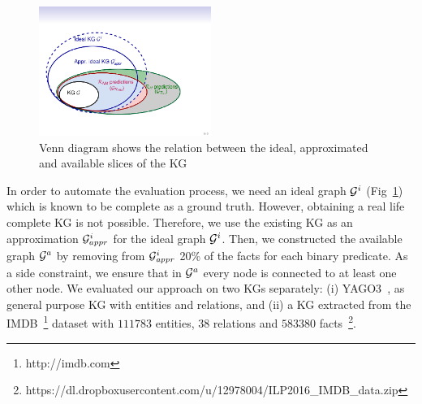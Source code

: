 \begin{figure}
\centering
\includegraphics[width=0.5\textwidth]{figures/big_pic_exp}
\caption{Venn diagram shows the relation between the ideal, approximated and available slices of the KG}
\label{fig:venn}
\end{figure}
 In order to automate the evaluation process, we need an ideal graph $\mathcal{G}^i$ (Fig~\ref{fig:venn}) which is known to be complete as a ground truth. However, obtaining a real life complete KG is not possible. Therefore, we use the existing KG as an approximation $\mathcal{G}^i_{appr}$ for the ideal graph $\mathcal{G}^i$. Then, we constructed the available graph $\mathcal{G}^a$ by removing from $\mathcal{G}^i_{\mathit{appr}}$ 20\% of the facts for each binary predicate. As a side constraint, we ensure that in $\mathcal{G}^a$ every node is connected to at least one other node. We evaluated our approach on two KGs separately: (i) YAGO3~\cite{yago3}, as general purpose KG with  entities and  relations, and (ii) a KG extracted from the IMDB~\footnote{http://imdb.com} dataset with $111783$ entities, $38$ relations and $583380$ facts~\footnote{https://dl.dropboxusercontent.com/u/12978004/ILP2016\_IMDB\_data.zip}. 

